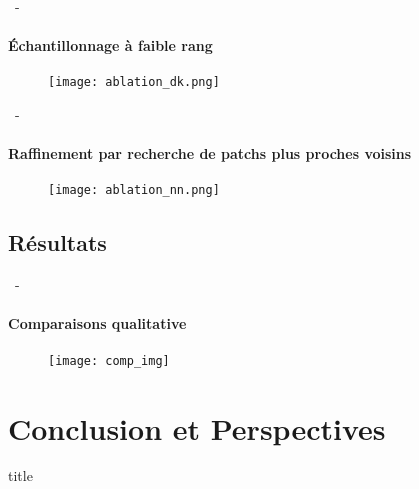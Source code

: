 \documentclass[aspectratio=169, 22pt]{beamer}
\begin{document}
\begin{frame}{\secname~- \subsecname}
  \framesubtitle{Échantillonnage à faible rang} 
  \begin{figure}
    \texttt{[image: ablation\_dk.png]}
  \end{figure}  
\end{frame}

\begin{frame}{\secname~- \subsecname}
  \framesubtitle{Raffinement par recherche de patchs plus proches voisins}
  \begin{figure}
    \texttt{[image: ablation\_nn.png]}
  \end{figure}    
\end{frame}

\subsection{Résultats}
\begin{frame}{\secname~- \subsecname}
  \framesubtitle{Comparaisons qualitative}
  \begin{figure}
    \texttt{[image: comp\_img]}
  \end{figure}
\end{frame}

\section{Conclusion et Perspectives}
\begin{frame}
  \begin{beamercolorbox}[sep=15pt,center,shadow=true,rounded=true]{title}
    \LARGE\bfseries \secname
  \end{beamercolorbox}
\end{frame}
\end{document}
